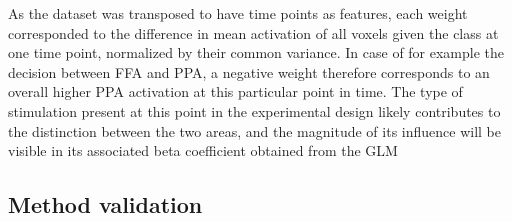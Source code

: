 \documentclass[a4paper, 12pt]{scrreprt}
\begin{document}
As the dataset was transposed to have time points as features, each weight corresponded to the difference in mean activation of all voxels given the class at one time point, normalized by their common variance. In case of for example the decision between FFA and PPA, a negative weight therefore corresponds to an overall higher PPA activation at this particular point in time. The type of stimulation present at this point in the experimental design likely contributes to the distinction between the two areas, and the magnitude of its influence will be visible in its associated beta coefficient obtained from the GLM \newline
 

\subsection{Method validation}\label{section:methodvalidation}
\end{document}
